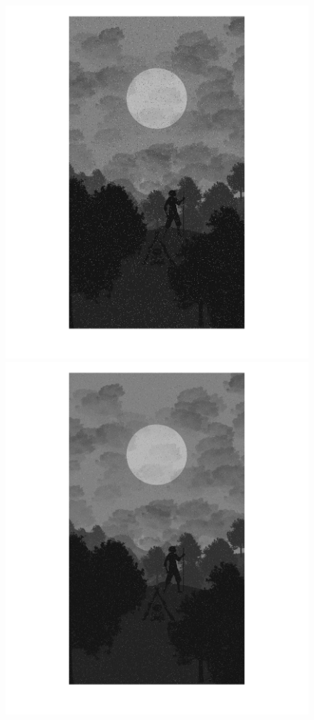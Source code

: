 \begin{figure}[htb] \centering
\includegraphics[scale=0.15]{Pictures/Esempi di utilizzo/Esempio 3/SfondoForesta_con_rumore.png}
\includegraphics[scale=0.15]{Pictures/Esempi di utilizzo/Esempio 3/SfondoForesta_filtrata_deltat0_01.png}

\end{figure}
